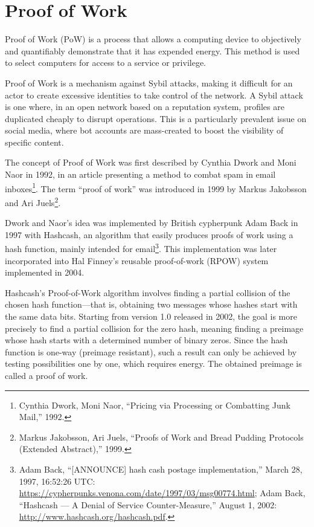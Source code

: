 \documentclass[
  a5paper,
  smalldemyvopaper,10pt,twoside,onecolumn,openright,extrafontsizes,hidelinks]{memoir}
\begin{document}
\section*{Proof of Work}\label{la-preuve-de-travail}


Proof of Work (PoW) is a process that allows a computing device to
objectively and quantifiably demonstrate that it has expended energy.
This method is used to select computers for access to a service or
privilege.

Proof of Work is a mechanism against Sybil attacks, making it difficult
for an actor to create excessive identities to take control of the
network. A Sybil attack is one where, in an open network based on a
reputation system, profiles are duplicated cheaply to disrupt
operations. This is a particularly prevalent issue on social media,
where bot accounts are mass-created to boost the visibility of specific
content.

The concept of Proof of Work was first described by Cynthia Dwork and
Moni Naor in 1992, in an article presenting a method to combat spam in
email inboxes\footnote{Cynthia Dwork, Moni Naor, ``Pricing via
  Processing or Combatting Junk Mail,'' 1992.}. The term ``proof of
work'' was introduced in 1999 by Markus Jakobsson and Ari
Juels\footnote{Markus Jakobsson, Ari Juels, ``Proofs of Work and Bread
  Pudding Protocols (Extended Abstract),'' 1999.}.

Dwork and Naor's idea was implemented by British cypherpunk Adam Back in
1997 with Hashcash, an algorithm that easily produces proofs of work
using a hash function, mainly intended for email\footnote{Adam Back,
  ``{[}ANNOUNCE{]} hash cash postage implementation,'' March 28, 1997,
  16:52:26 UTC:
  \url{https://cypherpunks.venona.com/date/1997/03/msg00774.html}; Adam
  Back, ``Hashcash --- A Denial of Service Counter-Measure,'' August 1,
  2002: \url{http://www.hashcash.org/hashcash.pdf}.}. This
implementation was later incorporated into Hal Finney's reusable
proof-of-work (RPOW) system implemented in 2004.

Hashcash's Proof-of-Work algorithm involves finding a partial collision
of the chosen hash function---that is, obtaining two messages whose
hashes start with the same data bits. Starting from version 1.0 released
in 2002, the goal is more precisely to find a partial collision for the
zero hash, meaning finding a preimage whose hash starts with a
determined number of binary zeros. Since the hash function is one-way
(preimage resistant), such a result can only be achieved by testing
possibilities one by one, which requires energy. The obtained preimage
is called a proof of work.
\end{document}
